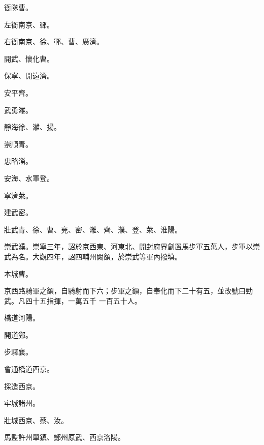 \begin{pinyinscope}
 衙隊曹。



 左衙南京、鄆。



 右衙南京、徐、鄆、曹、廣濟。



 開武、懷化曹。



 保寧、開遠濟。



 安平齊。



 武勇濰。



 靜海徐、濰、揚。



 崇順青。



 忠略淄。



 安海、水軍登。



 寧濟萊。



 建武密。



 壯武青、徐、曹、兗、密、濰、齊、濮、登、萊、淮陽。



 崇武濮。崇寧三年，詔於京西東、河東北、開封府界創置馬步軍五萬人，步軍以崇武為名。大觀四年，詔四輔州闕額，於崇武等軍內撥填。



 本城曹。



 京西路騎軍之額，自騎射而下六；步軍之額，自奉化而下二十有五，並改號曰勁武。凡四十五指揮，一萬五千
 一百五十人。



 橋道河陽。



 開道鄭。



 步驛襄。



 會通橋道西京。



 採造西京。



 牢城諸州。



 壯城西京、蔡、汝。



 馬監許州單鎮、鄭州原武、西京洛陽。




\end{pinyinscope}
